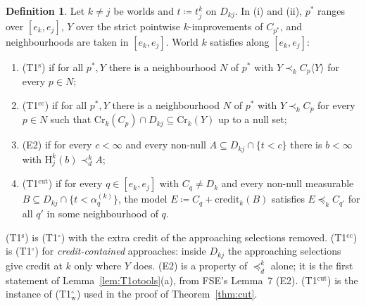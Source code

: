 \documentclass[11pt]{article}
\theoremstyle{definition}\newtheorem{definition}[theorem]{Definition}
\theoremstyle{remark}\newtheorem{remark}[theorem]{Remark}
\newcommand{\cred}{\mathrm{credit}}
\newcommand{\Hi}[3]{\mathrm H^{#1}_{#2}(#3)}
\newcommand{\Tw}{\textup{(T1$^\circ_{\mathrm w}$)}}
\newcommand{\To}{\textup{(T1$^\circ$)}}
\newcommand{\Ts}{\textup{(T1$^{\mathrm s}$)}}
\newcommand{\Tcc}{\textup{(T1$^{\mathrm{cc}}$)}}
\newcommand{\Tcut}{\textup{(T1$^{\mathrm{cut}}$)}}
\begin{document}
\begin{definition}\label{def:Ts}
Let $k\ne j$ be worlds and $t\coloneqq t^k_j$ on $D_{kj}$. In (i) and (ii),
$p^*$ ranges over $[e_k,e_j]$, $Y$ over the strict pointwise
$k$-improvements of $C_{p^*}$, and neighbourhoods are taken in $[e_k,e_j]$.
World $k$ satisfies along $[e_k,e_j]$:
\begin{enumerate}[label=(\roman*),leftmargin=*,itemsep=2pt]
\item \Ts{} if for all $p^*,Y$ there is a neighbourhood $N$ of $p^*$ with
$Y\prec_kC_p\langle Y\rangle$ for every $p\in N$;
\item \Tcc{} if for all $p^*,Y$ there is a neighbourhood $N$ of $p^*$ with
$Y\prec_kC_p$ for every $p\in N$ such that $\mathrm{Cr}_k(C_p)\cap D_{kj}
\subseteq\mathrm{Cr}_k(Y)$ up to a null set;
\item (E2) if for every $c<\infty$ and every non-null $A\subseteq
D_{kj}\cap\{t<c\}$ there is $b<\infty$ with $\Hi kjb\prec^k_dA$;
\item \Tcut{} if for every $q\in[e_k,e_j]$ with $C_q\ne D_k$ and every
non-null measurable $B\subseteq D_{kj}\cap\{t<\alpha^{(k)}_q\}$, the model
$E\coloneqq C_q+\cred_k(B)$ satisfies $E\preceq_kC_{q'}$ for all $q'$ in some
neighbourhood of $q$.
\end{enumerate}
\end{definition}

\Ts{} is \To{} with the extra credit of the approaching selections removed.
\Tcc{} is \To{} for \emph{credit-contained} approaches: inside $D_{kj}$ the
approaching selections give credit at $k$ only where $Y$ does. (E2) is a
property of $\preceq^k_d$ alone; it is the first statement of
Lemma~\ref{lem:T1otools}(a), from FSE's Lemma~7 (E2). \Tcut{} is the
instance of \Tw{} used in the proof of Theorem~\ref{thm:cut}.
\end{document}
